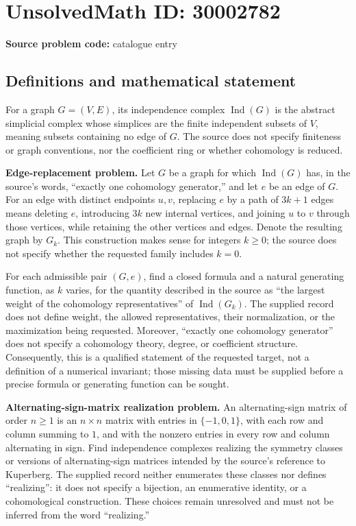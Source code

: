 \documentclass[11pt]{article}
\begin{document}
\section*{UnsolvedMath ID: 30002782}
\textbf{Source problem code:} catalogue entry
\subsection{Definitions and mathematical statement}
For a graph \(G=(V,E)\), its independence complex \(\operatorname{Ind}(G)\) is the abstract simplicial complex whose simplices are the finite independent subsets of \(V\), meaning subsets containing no edge of \(G\). The source does not specify finiteness or graph conventions, nor the coefficient ring or whether cohomology is reduced.

\textbf{Edge-replacement problem.} Let \(G\) be a graph for which \(\operatorname{Ind}(G)\) has, in the source's words, ``exactly one cohomology generator,'' and let \(e\) be an edge of \(G\). For an edge with distinct endpoints \(u,v\), replacing \(e\) by a path of \(3k+1\) edges means deleting \(e\), introducing \(3k\) new internal vertices, and joining \(u\) to \(v\) through those vertices, while retaining the other vertices and edges. Denote the resulting graph by \(G_k\). This construction makes sense for integers \(k\geq 0\); the source does not specify whether the requested family includes \(k=0\).

For each admissible pair \((G,e)\), find a closed formula and a natural generating function, as \(k\) varies, for the quantity described in the source as ``the largest weight of the cohomology representatives'' of \(\operatorname{Ind}(G_k)\). The supplied record does not define weight, the allowed representatives, their normalization, or the maximization being requested. Moreover, ``exactly one cohomology generator'' does not specify a cohomology theory, degree, or coefficient structure. Consequently, this is a qualified statement of the requested target, not a definition of a numerical invariant; those missing data must be supplied before a precise formula or generating function can be sought.

\textbf{Alternating-sign-matrix realization problem.} An alternating-sign matrix of order \(n\geq 1\) is an \(n\times n\) matrix with entries in \(\{-1,0,1\}\), with each row and column summing to \(1\), and with the nonzero entries in every row and column alternating in sign. Find independence complexes realizing the symmetry classes or versions of alternating-sign matrices intended by the source's reference to Kuperberg. The supplied record neither enumerates these classes nor defines ``realizing'': it does not specify a bijection, an enumerative identity, or a cohomological construction. These choices remain unresolved and must not be inferred from the word ``realizing.''
\end{document}
